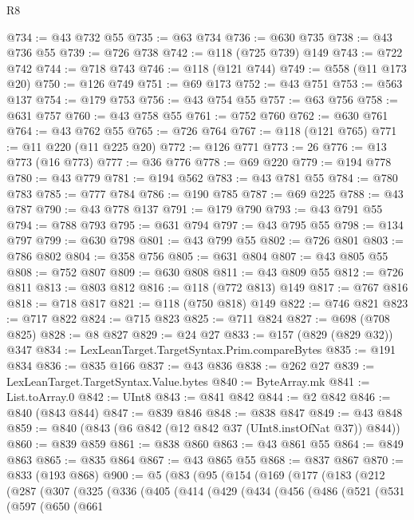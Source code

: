\begin{lexlean}{R8}
\begin{coremodule}
{{{{{{{{{{{{{{{{{{{{{{{{{{{{{{{{{{{{{{{{{{{{{@734 := @43 @732 @55
@735 := @63 @734
@736 := @630 @735
@738 := @43 @736 @55
@739 := @726 @738
@742 := @118 (@725 @739) @149
@743 := @722 @742
@744 := @718 @743
@746 := @118 (@121 @744)
@749 := @558 (@11 @173 @20)
@750 := @126 @749
@751 := @69 @173
@752 := @43 @751
@753 := @563 @137
@754 := @179 @753
@756 := @43 @754 @55
@757 := @63 @756
@758 := @631 @757
@760 := @43 @758 @55
@761 := @752 @760
@762 := @630 @761
@764 := @43 @762 @55
@765 := @726 @764
@767 := @118 (@121 @765)
@771 := @11 @220 (@11 @225 @20)
@772 := @126 @771
@773 := 26
@776 := @13 @773 (@16 @773)
@777 := @36 @776
@778 := @69 @220
@779 := @194 @778
@780 := @43 @779
@781 := @194 @562
@783 := @43 @781 @55
@784 := @780 @783
@785 := @777 @784
@786 := @190 @785
@787 := @69 @225
@788 := @43 @787
@790 := @43 @778 @137
@791 := @179 @790
@793 := @43 @791 @55
@794 := @788 @793
@795 := @631 @794
@797 := @43 @795 @55
@798 := @134 @797
@799 := @630 @798
@801 := @43 @799 @55
@802 := @726 @801
@803 := @786 @802
@804 := @358 @756
@805 := @631 @804
@807 := @43 @805 @55
@808 := @752 @807
@809 := @630 @808
@811 := @43 @809 @55
@812 := @726 @811
@813 := @803 @812
@816 := @118 (@772 @813) @149
@817 := @767 @816
@818 := @718 @817
@821 := @118 (@750 @818) @149
@822 := @746 @821
@823 := @717 @822
@824 := @715 @823
@825 := @711 @824
@827 := @698 (@708 @825)
@828 := @8 @827
@829 := @24 @27
@833 := @157 (@829 (@829 @32)) @347
@834 := LexLeanTarget.TargetSyntax.Prim.compareBytes
@835 := @191 @834
@836 := @835 @166
@837 := @43 @836
@838 := @262 @27
@839 := LexLeanTarget.TargetSyntax.Value.bytes
@840 := ByteArray.mk
@841 := List.toArray.{0}
@842 := UInt8
@843 := @841 @842
@844 := @2 @842
@846 := @840 (@843 @844)
@847 := @839 @846
@848 := @838 @847
@849 := @43 @848
@859 := @840 (@843 (@6 @842 (@12 @842 @37 (UInt8.instOfNat @37)) @844))
@860 := @839 @859
@861 := @838 @860
@863 := @43 @861 @55
@864 := @849 @863
@865 := @835 @864
@867 := @43 @865 @55
@868 := @837 @867
@870 := @833 (@193 @868)
@900 := @5
    (@83
      (@95
        (@154
          (@169
            (@177
              (@183
                (@212
                  (@287
                    (@307
                      (@325
                        (@336
                          (@405
                            (@414
                              (@429
                                (@434
                                  (@456
                                    (@486
                                      (@521
                                        (@531
                                          (@597
                                            (@650
                                              (@661
}}}}}}}}}}}}}}}}}}}}}}}}}}}}}}}}}}}}}}}}}}}}}
\end{coremodule}
\end{lexlean}

